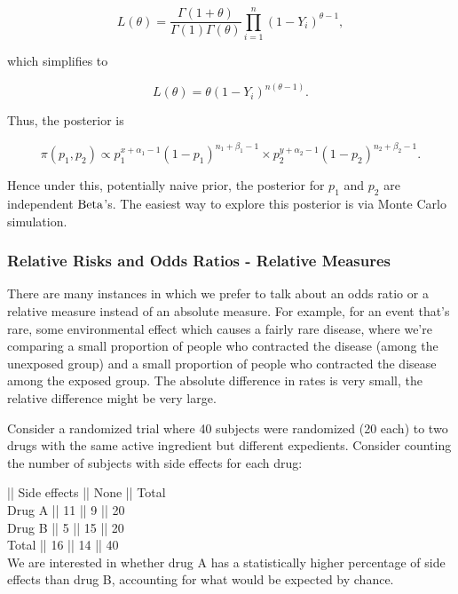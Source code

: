 \documentclass{homework}
\begin{document}
$$
L(\theta) = \frac{\Gamma(1+\theta)}{\Gamma(1)\Gamma(\theta)}\prod_{i=1}^n(1-Y_i)^{\theta-1},
$$

which simplifies to 

$$
L(\theta) = \theta(1-Y_i)^{n(\theta-1)}.
$$

Thus, the posterior is 

$$
\pi(p_1, p_2) \propto p_{1}^{x+\alpha_1-1}(1-p_{1})^{n_1+\beta_1-1} \times p_{2}^{y+\alpha_2-1}(1-p_{2})^{n_2+\beta_2-1}.
$$

Hence under this, potentially naive prior, the posterior for $p_1$ and $p_2$ are independent $\textnormal{Beta}$'s. The easiest way to explore this posterior is via Monte Carlo simulation.

\subsubsection{Relative Risks and Odds Ratios - Relative Measures}

There are many instances in which we prefer to talk about an odds ratio or a relative measure instead of an absolute measure. For example, for an event that's rare, some environmental effect which causes a fairly rare disease, where we're comparing a small proportion of people who contracted the disease (among the unexposed group) and a small proportion of people who contracted the disease among the exposed group. The absolute difference in rates is very small, the relative difference might be very large. \\

\begin{tcolorbox}[title=Motivation]

Consider a randomized trial where 40 subjects were randomized (20 each) to two drugs with the same active ingredient but different expedients. Consider counting the number of subjects with side effects for each drug:

|| Side effects || None || Total \\
Drug A || 11 || 9 || 20 \\
Drug B || 5 || 15 || 20 \\
Total || 16 || 14 || 40 \\
 
 We are interested in whether drug A has a statistically higher percentage of side effects than drug B, accounting for what would be expected by chance. 
 
\end{tcolorbox}
\end{document}
